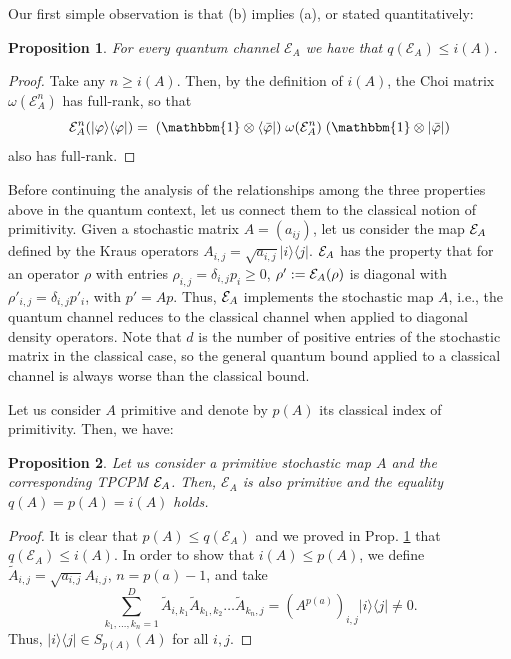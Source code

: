 \documentclass[journal,twoside]{IEEEtran}
\newtheorem{proposition}{Proposition}
\newcommand{\1}{\mathbbm{1}}
\def\E{{\cal E}}
\renewcommand{\>}{\rangle}
\newcommand{\<}{\langle}
\def\E{\mathcal{E}}
\def\1{\mathbbm{1}}
\begin{document}
Our first simple observation is that (b) implies (a), or stated
quantitatively:
\begin{proposition}\label{prop:iq}
For every quantum channel $\E_A$ we have that $q(\E_A)\leq i(A)$.
\end{proposition}
\begin{proof}
Take any $n\geq i(A)$. Then, by the definition of $i(A)$, the Choi
matrix $\omega(\E_A^n)$ has full-rank, so that
\begin{equation*}
\E_A^n(|\varphi\>\<\varphi|)=\;(\1\otimes\<\bar\varphi|)\;
\omega(\E_A^n)\;(\1\otimes|\bar\varphi|)
\end{equation*}
also has full-rank.
\end{proof}

Before continuing the analysis of the relationships among the three
properties above in the quantum context, let us connect them to the
classical notion of primitivity.  Given a stochastic matrix $A =
(a_{ij})$, let us consider the map ${\cal E}_A$ defined by the Kraus
operators $A_{i,j}=\sqrt{a_{i,j}} |i\rangle\langle j|$. ${\cal E}_A$
has the property that for an operator $\rho$ with entries
$\rho_{i,j}=\delta_{i,j} p_i\ge 0$, $\rho':={\cal E}_A (\rho)$ is
diagonal with $\rho'_{i,j}=\delta_{i,j} p'_i$, with $p'=Ap$. Thus,
${\cal E}_A$ implements the stochastic map $A$, i.e., the quantum
channel reduces to the classical channel when applied to diagonal
density operators. Note that $d$ is the number of positive entries
of the stochastic matrix in the classical case, so the general quantum bound
applied to a classical channel is always worse than the classical
bound.

Let us consider $A$ primitive and denote by $p(A)$ its classical
index of primitivity. Then, we have:

\begin{proposition}
Let us consider a primitive stochastic map $A$ and the corresponding
TPCPM ${\cal E}_A$. Then, $\E_A$ is also primitive and the equality
$q(A)=p(A)=i(A)$ holds.
\end{proposition}

\begin{proof}
It is clear that $p(A)\le q(\E_A)$ and we proved in Prop.
\ref{prop:iq} that $q(\E_A)\le i(A)$. In order to show that $i(A)\le
p(A)$, we define $\tilde A_{i,j}=\sqrt{a_{i,j}} A_{i,j}$, $n =
p(a)-1$, and take
 \begin{equation}
 \sum_{k_1,\ldots,k_n=1}^D \tilde A_{i,k_1} \tilde A_{k_1,k_2}\ldots
 \tilde A_{k_n,j}= (A^{p(a)})_{i,j} |i\rangle\langle j|\ne 0.
 \end{equation}
Thus, $|i\rangle\langle j|\in S_{p(A)}(A)$ for all $i,j$.
\end{proof}
\end{document}
